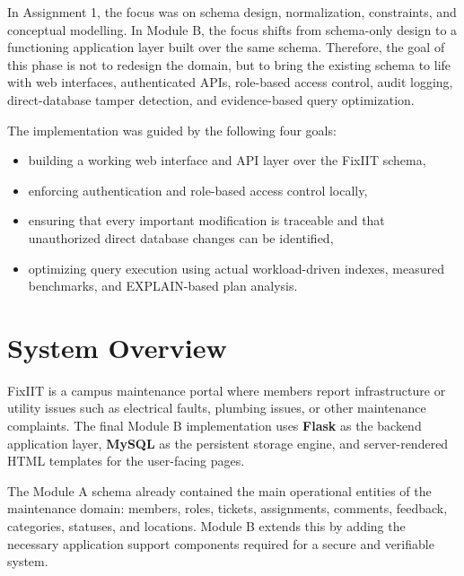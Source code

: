 \documentclass[12pt,a4paper]{article}
\begin{document}
In Assignment 1, the focus was on schema design, normalization, constraints, and conceptual modelling. In Module B, the focus shifts from schema-only design to a functioning application layer built over the same schema. Therefore, the goal of this phase is not to redesign the domain, but to bring the existing schema to life with web interfaces, authenticated APIs, role-based access control, audit logging, direct-database tamper detection, and evidence-based query optimization.

The implementation was guided by the following four goals:
\begin{itemize}[leftmargin=1.5em]
    \item building a working web interface and API layer over the FixIIT schema,
    \item enforcing authentication and role-based access control locally,
    \item ensuring that every important modification is traceable and that unauthorized direct database changes can be identified,
    \item optimizing query execution using actual workload-driven indexes, measured benchmarks, and EXPLAIN-based plan analysis.
\end{itemize}

\section{System Overview}
FixIIT is a campus maintenance portal where members report infrastructure or utility issues such as electrical faults, plumbing issues, or other maintenance complaints. The final Module B implementation uses \textbf{Flask} as the backend application layer, \textbf{MySQL} as the persistent storage engine, and server-rendered HTML templates for the user-facing pages.

The Module A schema already contained the main operational entities of the maintenance domain: members, roles, tickets, assignments, comments, feedback, categories, statuses, and locations. Module B extends this by adding the necessary application support components required for a secure and verifiable system.
\end{document}
